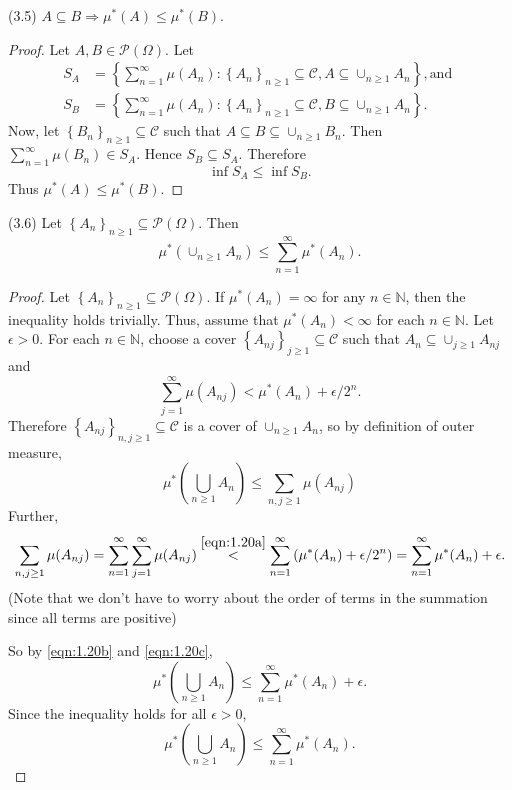 \documentclass[12pt]{article}
\begin{document}
(3.5) $A \subseteq B \Rightarrow \mu^{*}(A) \leq \mu^{*}(B)$.

\begin{proof}
Let $A, B \in \mathcal{P}(\Omega)$. Let 
\begin{align*}
S_{A} & = \left\{ \sum_{n=1}^{\infty}\mu(A_{n}) : \left\{ A_{n} \right\}_{n\geq 1}\subseteq \mathcal{C}, A\subseteq\cup_{n\geq 1}A_{n} \right\}, \text{
and } \\
S_{B} & = \left\{ \sum_{n=1}^{\infty}\mu(A_{n}) : \left\{ A_{n} \right\}_{n\geq 1}\subseteq \mathcal{C}, B\subseteq\cup_{n\geq 1}A_{n} \right\}.
\end{align*}
Now, let $\left\{ B_{n} \right\}_{n\geq 1} \subseteq \mathcal{C}$ such that $A\subseteq B\subseteq \cup_{n\geq 1}B_{n}$. Then
$\sum_{n=1}^{\infty}\mu(B_{n}) \in S_{A}$. Hence $S_{B} \subseteq S_{A}$. Therefore 
\[ \inf S_{A} \leq \inf S_{B}. \]
Thus $\mu^{*}(A) \leq \mu^{*}(B)$.
\end{proof}

(3.6) Let $\left\{ A_{n} \right\}_{n\geq 1} \subseteq \mathcal{P}(\Omega)$. Then 
\[ \mu^{*}\left( \cup_{n\geq 1}A_{n} \right) \leq \sum_{n=1}^{\infty}\mu^{*}(A_{n}). \]

\begin{proof}
Let $\left\{ A_{n} \right\}_{n\geq 1} \subseteq \mathcal{P}(\Omega)$. If $\mu^{*}(A_{n}) = \infty$ for any $n \in \mathbb{N}$, then the inequality
holds trivially. Thus, assume that $\mu^{*}(A_{n}) < \infty$ for each $n \in \mathbb{N}$. Let $\epsilon > 0$. For each $n \in \mathbb{N}$, choose a
cover $\left\{ A_{nj} \right\}_{j \geq 1} \subseteq \mathcal{C}$ such that $A_{n}\subseteq \cup_{j\geq 1}A_{nj}$ and 
\begin{equation}
\sum_{j=1}^{\infty}\mu(A_{nj}) < \mu^{*}(A_{n}) + \epsilon / 2^{n}. 
\label{eqn:1.20a}
\end{equation}
Therefore $\left\{ A_{nj} \right\}_{n,j\geq 1}\subseteq \mathcal{C}$ is a cover of $\cup_{n\geq 1}A_{n}$, so by definition of outer measure,
\begin{equation}
\mu^{*}\left( \bigcup_{n\geq 1} A_{n}\right) \leq \sum_{n,j\geq 1}\mu(A_{nj})
\label{eqn:1.20b}
\end{equation}
Further,
\begin{equation}
\sum_{n,j\geq 1}\mu(A_{nj}) = \sum_{n=1}^{\infty}\sum_{j=1}^{\infty}\mu(A_{nj}) \stackrel{\ref{eqn:1.20a}}{<} \sum_{n=1}^{\infty}\left( \mu^{*}(A_{n}) + \epsilon / 2^{n} \right)
 = \sum_{n=1}^{\infty}\mu^{*}(A_{n}) + \epsilon.
\label{eqn:1.20c}
\end{equation}
(Note that we don't have to worry about the order of terms in the summation since all terms are positive)

So by \ref{eqn:1.20b} and \ref{eqn:1.20c}, 
\[ \mu^{*}\left( \bigcup_{n\geq 1}A_{n} \right) \leq \sum_{n=1}^{\infty}\mu^{*}(A_{n}) + \epsilon. \]
Since the inequality holds for all $\epsilon > 0$, 
\[ \mu^{*}\left( \bigcup_{n\geq 1}A_{n} \right) \leq \sum_{n=1}^{\infty}\mu^{*}(A_{n}). \]
\end{proof}
\end{document}
